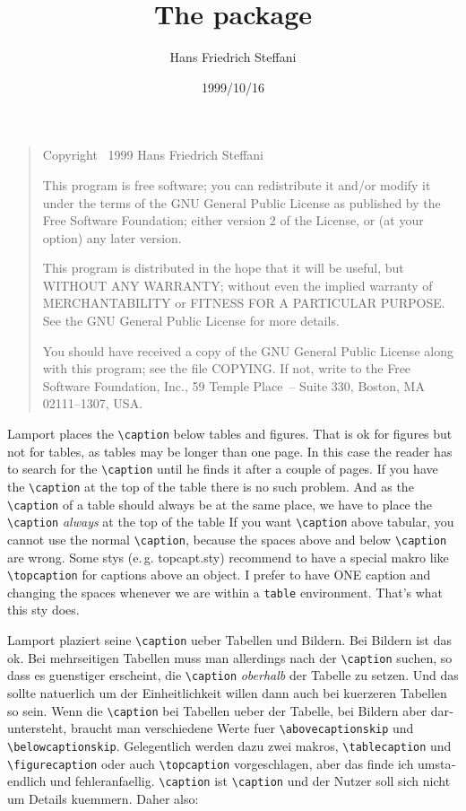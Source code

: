 \documentclass[german, american, parskip=half, pagesize=auto]{scrartcl}
\title{The \pkg{ftcap} package}
\author{Hans Friedrich Steffani\\\mail{hans.steffani@e-technik.tu-chemnitz.de}}
\date{1999/10/16}
\newcommand*{\pkg}[1]{\textsf{#1}}
\newcommand*{\env}[1]{\texttt{#1}}
\begin{document}
\maketitle

\begin{quote}
  \footnotesize
  Copyright \textcopyright\ 1999 Hans Friedrich Steffani

  This program is free software; you can redistribute it and/or modify
  it under the terms of the GNU General Public License as published by
  the Free Software Foundation; either version 2 of the License, or
  (at your option) any later version.

  This program is distributed in the hope that it will be useful,
  but WITHOUT ANY WARRANTY; without even the implied warranty of
  MERCHANTABILITY or FITNESS FOR A PARTICULAR PURPOSE\@.  See the
  GNU General Public License for more details.

  You should have received a copy of the GNU General Public License
  along with this program; see the file COPYING\@.  If not, write to
  the Free Software Foundation, Inc., 59 Temple Place~-- Suite 330,
  Boston, MA 02111--1307, USA.
\end{quote}


\noindent
Lamport places the \verb|\caption| below tables and figures. That is ok
for figures but not for tables, as tables may be longer than one
page. In this case the reader has to search for the \verb|\caption|
until  he finds it after a couple of pages. If you have the
\verb|\caption| at  the top of the table there is no such problem.
And as the \verb|\caption|  of a table should always be at the same place,
we have to place the  \verb|\caption| \emph{always} at the top of
the table  If you want \verb|\caption| above tabular, you cannot
use the normal  \verb|\caption|, because the spaces above and below
\verb|\caption| are wrong.   Some stys (e.\,g. \pkg{topcapt.sty}) recommend
to have a special makro like  \verb|\topcaption| for captions above
an object. I prefer to have ONE  caption and changing the spaces
whenever we are within a \env{table}  environment. That's what this sty
does.

\begin{otherlanguage}{german}
  Lamport plaziert seine \verb|\caption| ueber Tabellen und Bildern.
  Bei Bildern ist das ok. Bei mehrseitigen Tabellen muss man
  allerdings nach der \verb|\caption| suchen, so dass es guenstiger
  erscheint, die \verb|\caption| \emph{oberhalb} der Tabelle zu
  setzen. Und das sollte natuerlich um der Einheitlichkeit willen
  dann auch bei kuerzeren Tabellen so sein.
  Wenn die \verb|\caption| bei Tabellen ueber der Tabelle, bei
  Bildern aber  daruntersteht, braucht man verschiedene Werte fuer
  \verb|\abovecaptionskip| und \verb|\belowcaptionskip|.
  Gelegentlich werden dazu zwei makros, \verb|\tablecaption| und
  \verb|\figurecaption| oder auch \verb|\topcaption| vorgeschlagen,
  aber das finde ich umstaendlich und fehleranfaellig.
  \verb|\caption| ist \verb|\caption| und der Nutzer soll sich nicht
  um Details  kuemmern. Daher also:
\end{otherlanguage}
\end{document}
